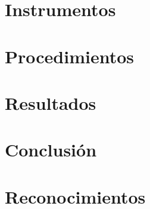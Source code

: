 \documentclass[journal]{IEEEtran}
\begin{document}
\section{Instrumentos}


\section{Procedimientos}


\section{Resultados}


\section{Conclusión}


\appendices


\section*{Reconocimientos}





\end{document}
